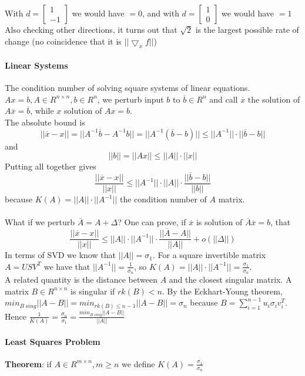 \documentclass[10pt]{report}
\begin{document}
With $d = \left[\begin{array}{c}
1\\-1
\end{array}\right]$ we would have $= 0$, and with $d = \left[\begin{array}{c}
1\\0
\end{array}\right]$ we would have $= 1$\\
Also checking other directions, it turns out that $\sqrt{2}$ is the largest possible rate of change (no coincidence that it is $||\bigtriangledown_x f||$)
\paragraph{Linear Systems} The condition number of solving square systems of linear equations.\\
$Ax = b, A\in R^{n\times n}, b\in R^n$, we perturb input $b$ to $\overline{b}\in R^n$ and call $\overline{x}$ the solution of $A\overline{x} = \overline{b}$, while $x$ solution of $Ax=b$.\\
The absolute bound is $$||\overline{x}-x|| = ||A^{-1}\overline{b} - A^{-1}b|| = ||A^{-1}(\overline{b}-b)||\leq ||A^{-1}||\cdot ||\overline{b}-b||$$ and $$||b|| = ||Ax|| \leq ||A||\cdot||x||$$Putting all together gives $$\frac{||\overline{x} - x||}{||x||} \leq ||A^{-1}||\cdot||A||\cdot\frac{||\overline{b}-b||}{||b||}$$ because $K(A) = ||A||\cdot||A^{-1}||$ the condition number of $A$ matrix.\\\\
What if we perturb $\overline{A} = A + \Delta$? One can prove, if $\overline{x}$ is solution of $\overline{A}\overline{x} = b$, that $$\frac{||\overline{x} - x||}{||x||} \leq ||A||\cdot||A^{-1}||\cdot\frac{||\overline{A}-A||}{||A||}+o(||\Delta||)$$ In terms of SVD we know that $||A|| = \sigma_1$. For a square invertible matrix $A=USV^T$ we have that $||A^{-1}|| = \frac{1}{\sigma_n}$, so $K(A) = ||A||\cdot||A^{-1}|| = \frac{\sigma_1}{\sigma_n}$.\\
A related quantity is the distance between $A$ and the closest singular matrix. A matrix $B\in R^{n\times n}$ is singular if $rk(B)<n$. By the Eckhart-Young theorem, $min_{B\:sing}||A-B|| = min_{rk(B)\leq n-1}||A-B|| = \sigma_n$ because $B=\sum_{i=1}^{n-1} u_i\sigma_iv_i^T$. Hence $\frac{1}{K(A)} = \frac{\sigma_n}{\sigma_1} = \frac{min_{B\:sing}||A-B||}{||A||}$
\paragraph{Least Squares Problem} \textbf{Theorem}: if $A\in R^{m\times n}, m\geq n$ we define $K(A)=\frac{\sigma_1}{\sigma_n}$
\end{document}
